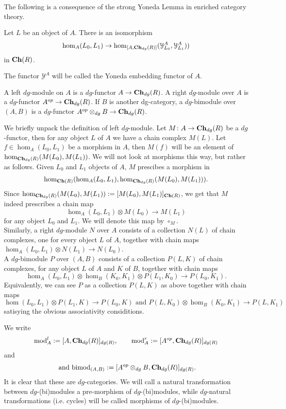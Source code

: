 The following is a consequence of the strong Yoneda Lemma in enriched category theory.
\begin{thm}
    Let $L$ be an object of $A$. There is an isomorphism $$\hom_A(L_0,L_1)\to \hom_{[A,\mathbf{Ch}_{dg}(R)]}(\mathcal{Y}^A_{L_0},\mathcal{Y}^A_{L_1}))$$ in $\mathbf{Ch}(R)$.
\end{thm}

The functor $\mathcal{Y}^A$ will be called the Yoneda embedding functor of $A$.


\begin{dfn}
    A left $dg$-module on $A$ is a $dg$-functor $A\to \mathbf{Ch}_{dg}(R)$. A right $dg$-module over $A$ is a $dg$-functor $A^{op}\to \mathbf{Ch}_{dg}(R)$. If $B$ is another dg-category, a $dg$-bimodule over $(A,B)$ is a $dg$-functor $A^{op}\otimes_{dg}B\to \mathbf{Ch}_{dg}(R)$.
\end{dfn}
We briefly unpack the definition of left $dg$-module. Let $M\colon A\to \mathbf{Ch}_{dg}(R)$ be a $dg$-functor, then for any object $L$ of $A$ we have a chain complex $M(L)$. Let $f\in \hom_A(L_0,L_1)$ be a morphism in $A$, then $M(f)$ will be an element of $\hom_{\mathbf{Ch}_{dg}(R)}(M(L_0),M(L_1))$. We will not look at morphisms this way, but rather as follows. Given $L_0$ and $L_1$ objects of $A$, $M$ prescibes a morphism in $$\hom_{\mathbf{Ch}(R)}(\hom_A(L_0,L_1), \hom_{\mathbf{Ch}_{dg}(R)}(M(L_0),M(L_1))).$$ Since $\hom_{\mathbf{Ch}_{dg}(R)}(M(L_0),M(L_1)):= [M(L_0), M(L_1)]_{\mathbf{Ch}(R)}$, we get that $M$ indeed prescribes a chain map $$\hom_A(L_0,L_1)\otimes M(L_0)\to M(L_1)$$ for any object $L_0$ and $L_1$. We will denote this map by $\circ_M$. \\Similarly, a right $dg$-module $N$ over $A$ consists of a collection $N(L)$ of chain complexes, one for every object $L$ of $A$, together with chain maps $\hom_A(L_0,L_1)\otimes N(L_1)\to N(L_0)$. \\ A $dg$-bimodule $P$ over $(A,B)$ consists of a collection $P(L,K)$ of chain complexes, for any object $L$ of $A$ and $K$ of $B$, together with chain maps $$\hom_A(L_0,L_1)\otimes \hom_B(K_0,K_1)\otimes P(L_1,K_0)\to P(L_0,K_1).$$ Equivalently,  we can see $P$ as a collection $P(L,K)$ as above together with chain maps $$\hom(L_0,L_1)\otimes P(L_1,K)\to P(L_0,K) \text{    and    }P(L,K_0)\otimes \hom_B(K_0,K_1)\to P(L,K_1)$$ satisying the obvious associativity considitions.

We write $$\text{mod}^l_A:= [A,\mathbf{Ch}_{dg}(R)]_{dg(R)},\qquad \text{mod}^r_A:= [A^{op},\mathbf{Ch}_{dg}(R)]_{dg(R)}$$ and $$ \text{   and   }\text{bimod}_{(A,B)}:=[A^{op}\otimes_{dg}B, \mathbf{Ch}_{dg}(R)]_{dg(R)}.$$ It is clear that these are $dg$-categories. We will call a natural transformation between $dg$-(bi)modules a pre-morphism of $dg$-(bi)modules, while $dg$-natural transformations (i.e. cycles) will be called morphisms of $dg$-(bi)modules.

